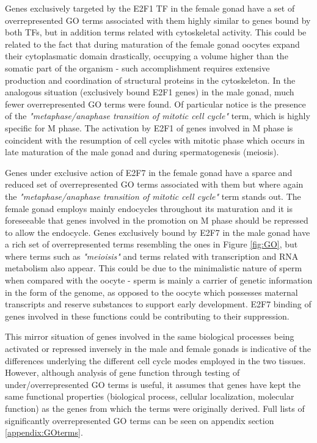 \documentclass[11pt,twoside,a4paper]{report}
\begin{document}
		Genes exclusively targeted by the E2F1 TF in the female gonad have a set of overrepresented GO terms associated with them highly similar to genes bound by both TFs, but in addition terms related with cytoskeletal activity. This could be related to the fact that during maturation of the female gonad oocytes expand their cytoplasmatic domain drastically, occupying a volume higher than the somatic part of the organism - such accomplishment requires extensive production and coordination of structural proteins in the cytoskeleton. In the analogous situation (exclusively bound E2F1 genes) in the male gonad, much fewer overrepresented GO terms were found. Of particular notice is the presence of the \textit{"metaphase/anaphase transition of mitotic cell cycle"} term, which is highly specific for M phase. The activation by E2F1 of genes involved in M phase is coincident with the resumption of cell cycles with mitotic phase which occurs in late maturation of the male gonad and during spermatogenesis (meiosis).
		
		Genes under exclusive action of E2F7 in the female gonad have a sparce and reduced set of overrepresented GO terms associated with them but where again the \textit{"metaphase/anaphase transition of mitotic cell cycle"} term stands out. The female gonad employs mainly endocycles throughout its maturation and it is foreseeable that genes involved in the promotion on M phase should be repressed to allow the endocycle. Genes exclusively bound by E2F7 in the male gonad have a rich set of overrepresented terms resembling the ones in Figure \ref{fig:GO}, but where terms such as \textit{"meioisis"} and terms related with transcription and RNA metabolism also appear. This could be due to the minimalistic nature of sperm when compared with the oocyte - sperm is mainly a carrier of genetic information in the form of the genome, as opposed to the oocyte which possesses maternal transcripts and reserve substances to support early development. E2F7 binding of genes involved in these functions could be contributing to their suppression.
		
		This mirror situation of genes involved in the same biological processes being activated or repressed inversely in the male and female gonads is indicative of the differences underlying the different cell cycle modes employed in the two tissues. However, although analysis of gene function through testing of under/overrepresented GO terms is useful, it assumes that genes have kept the same functional properties (biological process, cellular localization, molecular function) as the genes from which the terms were originally derived. Full lists of significantly overrepresented GO terms can be seen on appendix section \ref{appendix:GOterms}.		
		
\end{document}
